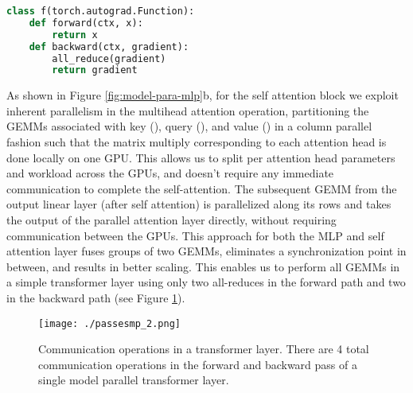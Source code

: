 \documentclass{article}
\begin{document}
\begin{lstlisting}[language=Python, caption={Implementation of  operator.  is similar to  with identity in the backward and all-reduce in the forward functions.}]
class f(torch.autograd.Function):
    def forward(ctx, x):
        return x
    def backward(ctx, gradient):
        all_reduce(gradient)
        return gradient
\end{lstlisting}

As shown in Figure \ref{fig:model-para-mlp}b, for the self attention block we exploit inherent parallelism in the multihead attention operation, partitioning the GEMMs associated with key (), query (), and value () in a column parallel fashion such that the matrix multiply corresponding to each attention head is done locally on one GPU. This allows us to split per attention head parameters and workload across the GPUs, and doesn’t require any immediate communication to complete the self-attention. The subsequent GEMM from the output linear layer (after self attention) is parallelized along its rows and takes the output of the parallel attention layer directly, without requiring communication between the GPUs. This approach for both the MLP and self attention layer fuses groups of two GEMMs, eliminates a synchronization point in between, and results in better scaling. This enables us to perform all GEMMs in a simple transformer layer using only two all-reduces in the forward path and two in the backward path (see Figure \ref{fig:gpt2-transformerpasses}).

\begin{figure}
\begin{center}
 \texttt{[image: ./passesmp\_2.png]}
 \caption{Communication operations in a transformer layer. There are 4 total communication operations in the forward and backward pass of a single model parallel transformer layer.}
 \label{fig:gpt2-transformerpasses}
 \vspace{-6mm}
\end{center}
\end{figure}
\end{document}
